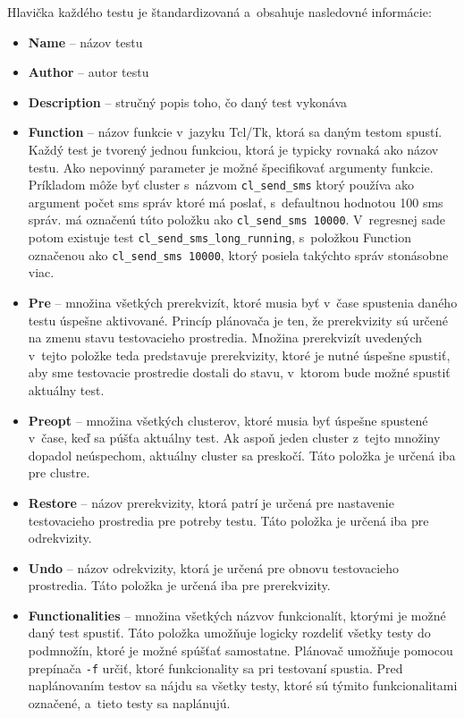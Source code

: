 Hlavička každého testu je štandardizovaná a~obsahuje nasledovné informácie:
\begin{itemize}
\item \textbf{Name} -- názov testu
\item \textbf{Author} -- autor testu
\item \textbf{Description} -- stručný popis toho, čo daný test vykonáva
\item \textbf{Function} -- názov funkcie v~jazyku Tcl/Tk, ktorá sa daným testom spustí. Každý test je tvorený jednou funkciou, ktorá je typicky rovnaká
ako názov testu. Ako nepovinný parameter je možné špecifikovať argumenty funkcie. Príkladom môže byť cluster s~názvom \texttt{cl\_send\_sms} ktorý používa
ako argument počet sms správ ktoré má poslať, s~defaultnou hodnotou 100 sms správ.  
má označenú túto položku ako \texttt{cl\_send\_sms 10000}. V~regresnej sade potom existuje test \texttt{cl\_send\_sms\_long\_running}, 
s~položkou Function označenou ako \texttt{cl\_send\_sms 10000}, ktorý posiela takýchto správ stonásobne viac.
\item \textbf{Pre} -- množina všetkých prerekvizít, ktoré musia byť v~čase spustenia daného testu úspešne aktivované. Princíp plánovača je ten,
že prerekvizity sú určené na zmenu stavu testovacieho prostredia. Množina prerekvizít uvedených v~tejto položke teda predstavuje prerekvizity, ktoré
je nutné úspešne spustiť, aby sme testovacie prostredie dostali do stavu, v~ktorom bude možné spustiť aktuálny test.
\item \textbf{Preopt} -- množina všetkých clusterov, ktoré musia byť úspešne spustené v~čase, keď sa púšťa aktuálny test. Ak aspoň jeden cluster z~tejto množiny
dopadol neúspechom, aktuálny cluster sa preskočí. Táto položka je určená iba pre clustre.
\item \textbf{Restore} -- názov prerekvizity, ktorá patrí je určená pre nastavenie testovacieho prostredia pre potreby testu. Táto položka je určená iba pre odrekvizity.
\item \textbf{Undo} -- názov odrekvizity, ktorá je určená pre obnovu testovacieho prostredia. Táto položka je určená iba pre prerekvizity. 
\item \textbf{Functionalities} -- množina všetkých názvov funkcionalít, ktorými je možné daný test spustiť. 
Táto položka umožňuje logicky rozdeliť všetky testy do podmnožín, ktoré je možné spúšťať samostatne. 
Plánovač umožňuje pomocou prepínača \texttt{-f} určiť, ktoré funkcionality sa pri testovaní spustia.
Pred naplánovaním testov sa nájdu sa všetky testy, ktoré sú týmito funkcionalitami označené, a~tieto testy sa naplánujú.

\end{itemize}
